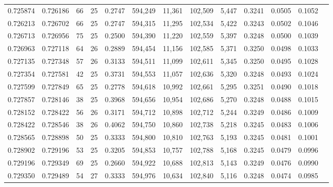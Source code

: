 \begin{tabular}{rrrrrrrrrrrrr}
0.725874 & 0.726186 &  66 &  25 &                                     0.2747 & 594,249 &  11,361 & 102,509 &   5,447 & 0.3241 & 0.0505 & 0.1052 \\
0.726213 & 0.726702 &  66 &  25 &                                     0.2747 & 594,315 &  11,295 & 102,534 &   5,422 & 0.3243 & 0.0502 & 0.1046 \\
0.726713 & 0.726956 &  75 &  25 &                                     0.2500 & 594,390 &  11,220 & 102,559 &   5,397 & 0.3248 & 0.0500 & 0.1039 \\
0.726963 & 0.727118 &  64 &  26 &                                     0.2889 & 594,454 &  11,156 & 102,585 &   5,371 & 0.3250 & 0.0498 & 0.1033 \\
0.727135 & 0.727348 &  57 &  26 &                                     0.3133 & 594,511 &  11,099 & 102,611 &   5,345 & 0.3250 & 0.0495 & 0.1028 \\
0.727354 & 0.727581 &  42 &  25 &                                     0.3731 & 594,553 &  11,057 & 102,636 &   5,320 & 0.3248 & 0.0493 & 0.1024 \\
0.727599 & 0.727849 &  65 &  25 &                                     0.2778 & 594,618 &  10,992 & 102,661 &   5,295 & 0.3251 & 0.0490 & 0.1018 \\
0.727857 & 0.728146 &  38 &  25 &                                     0.3968 & 594,656 &  10,954 & 102,686 &   5,270 & 0.3248 & 0.0488 & 0.1015 \\
0.728152 & 0.728422 &  56 &  26 &                                     0.3171 & 594,712 &  10,898 & 102,712 &   5,244 & 0.3249 & 0.0486 & 0.1009 \\
0.728422 & 0.728546 &  38 &  26 &                                     0.4062 & 594,750 &  10,860 & 102,738 &   5,218 & 0.3245 & 0.0483 & 0.1006 \\
0.728565 & 0.728898 &  50 &  25 &                                     0.3333 & 594,800 &  10,810 & 102,763 &   5,193 & 0.3245 & 0.0481 & 0.1001 \\
0.728902 & 0.729196 &  53 &  25 &                                     0.3205 & 594,853 &  10,757 & 102,788 &   5,168 & 0.3245 & 0.0479 & 0.0996 \\
0.729196 & 0.729349 &  69 &  25 &                                     0.2660 & 594,922 &  10,688 & 102,813 &   5,143 & 0.3249 & 0.0476 & 0.0990 \\
0.729350 & 0.729489 &  54 &  27 &                                     0.3333 & 594,976 &  10,634 & 102,840 &   5,116 & 0.3248 & 0.0474 & 0.0985 \\

\end{tabular}
